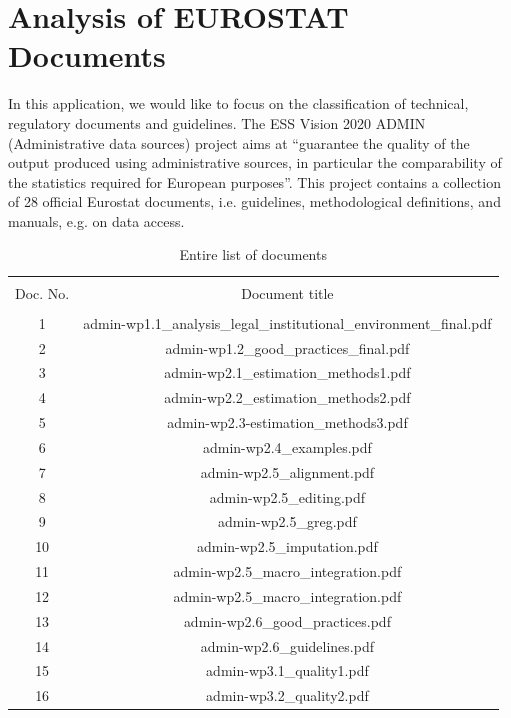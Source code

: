 \documentclass[11pt,a4paper]{article}
\begin{document}
\section{Analysis of EUROSTAT Documents}\label{sec:example2}

In this application, we would like to focus on the classification of technical, regulatory documents and guidelines. The ESS Vision 2020 ADMIN (Administrative data sources) project aims at “guarantee the quality of the output produced using administrative sources, in particular the comparability of the statistics required for European purposes”\cite{ESSVision2020}. This project contains a collection of 28 official Eurostat documents, i.e. guidelines, methodological definitions, and manuals, e.g. on data access.\\
\begin{table}[!htbp] \centering 
	\caption{Entire list of documents} 
	\label{} 
	\begin{tabular}{@{\extracolsep{5pt}} cc} 
		\\[-1.8ex]\hline 
		\hline \\[-1.8ex] 
		Doc. No. & Document title \\ 
		\hline \\[-1.8ex] 
		1 & admin-wp1.1\_analysis\_legal\_institutional\_environment\_final.pdf \\ 
		2 & admin-wp1.2\_good\_practices\_final.pdf \\ 
		3 & admin-wp2.1\_estimation\_methods1.pdf \\ 
		4 & admin-wp2.2\_estimation\_methods2.pdf \\ 
		5 & admin-wp2.3-estimation\_methods3.pdf \\ 
		6 & admin-wp2.4\_examples.pdf \\ 
		7 & admin-wp2.5\_alignment.pdf \\ 
		8 & admin-wp2.5\_editing.pdf \\ 
		9 & admin-wp2.5\_greg.pdf \\ 
		10 & admin-wp2.5\_imputation.pdf \\ 
		11 & admin-wp2.5\_macro\_integration.pdf \\ 
		12 & admin-wp2.5\_macro\_integration.pdf \\ 
		13 & admin-wp2.6\_good\_practices.pdf \\ 
		14 & admin-wp2.6\_guidelines.pdf \\ 
		15 & admin-wp3.1\_quality1.pdf \\ 
		16 & admin-wp3.2\_quality2.pdf \\ 

\end{tabular}
\end{table}
\end{document}
